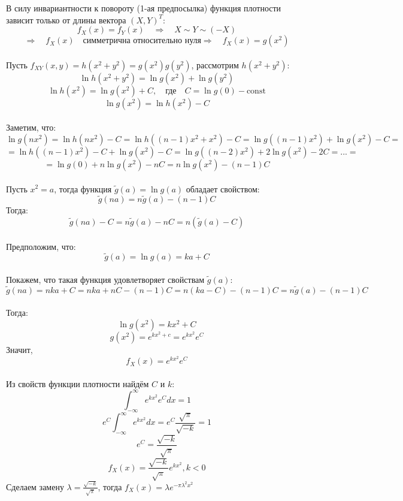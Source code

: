 \documentclass[12pt,a4paper]{article}
\begin{document}
В силу инвариантности к повороту (1-ая предпосылка) функция плотности зависит только от длины вектора $(X, Y)^T$:
\[f_X(x)=f_Y(x) \quad \Rightarrow \quad X \sim Y \sim (-X)  \]
\[\Rightarrow \quad f_X(x) \quad \text{симметрична относительно нуля} \Rightarrow \quad f_X(x)=g(x^2) \]
\vspace{0.05 in} 
\\
Пусть $f_{XY}(x,y)=h(x^2+y^2)=g(x^2)g(y^2)$, рассмотрим $h(x^2+y^2)$:
\[ \ln h(x^2+y^2)= \ln g(x^2)+\ln g(y^2)\]
\[\ln h(x^2) = \ln g(x^2) + C, \quad \text{где} \quad C=\ln g(0)-\text{const} \]
\[ \ln g(x^2) = \ln h(x^2) - C\]
\vspace{0.05 in} 
\\
Заметим, что:
\[ \ln g(nx^2) = \ln h(nx^2) - C= \ln h ((n-1)x^2+x^2) - C = \ln g ((n-1)x^2)+  \ln g(x^2) - C =\]
\[= \ln h((n-1)x^2) - C + \ln g(x^2) - C = \ln g((n-2)x^2) + 2\ln g(x^2) - 2C = ...=\]
\[=\ln g(0) + n\ln g(x^2)-nC=n\ln g(x^2)-(n-1)C\]
\vspace{0.05 in} 
\\
Пусть $x^2=a$, тогда функция $\tilde{g}(a)=\ln g(a)$ обладает свойством:
\[\tilde{g}(na)=n\tilde{g}(a)-(n-1)C\]
Тогда:
\[\tilde{g}(na)-C=n\tilde{g}(a)-nC=n(\tilde{g}(a)-C)\]
\vspace{0.05 in} 
\\
Предположим, что:
\[\tilde{g}(a)=\ln g(a) =ka + C\]
\vspace{0.05 in} 
\\
Покажем, что такая функция удовлетворяет свойствам $\tilde{g}(a)$:
\[\tilde{g}(na)=nka+C=nka+nC-(n-1)C=n(ka-C)-(n-1)C=n\tilde{g}(a)-(n-1)C\]
\vspace{0.05 in} 
\\
Тогда:
\[ \ln g(x^2) = kx^2+C\]
\[g(x^2)=e^{kx^2+c}=e^{kx^2}e^C\]
Значит,
\[f_X(x)=e^{kx^2}e^C\]
\vspace{0.05 in} 
\\
Из свойств функции плотности найдём $C$ и $k$:
\[ \int_{-\infty}^{\infty} e^{kx^2}e^C dx= 1\]
\[e^C   \int_{-\infty}^{\infty} e^{kx^2} dx= e^C \frac{\sqrt{\pi}}{\sqrt{-k}}=1 \]
\[e^C = \frac{\sqrt{-k}}{\sqrt{\pi}}\]
\[f_X(x)=\frac{\sqrt{-k}}{\sqrt{\pi}} e^{kx^2}, k<0\]
Сделаем замену $\lambda = \frac{\sqrt{-k}}{\sqrt{\pi}}$, тогда $f_X(x)=\lambda e^{-\pi{\lambda}^2x^2}$
\vspace{0.4 in} 
\\

\begin{tikzpicture}
	
\end{tikzpicture}
\end{document}
